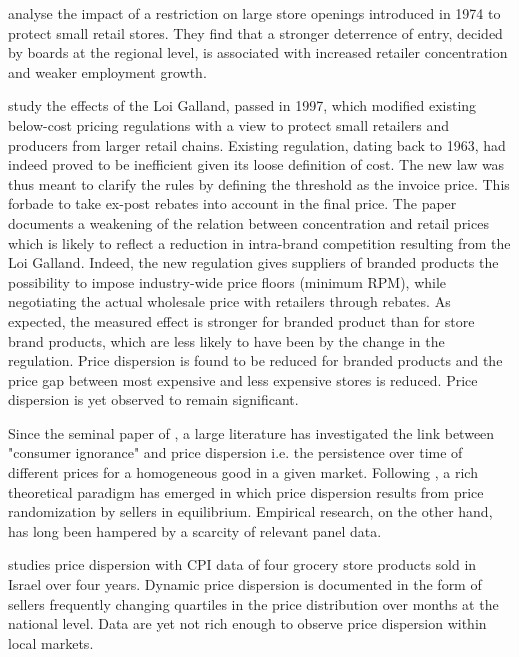 \documentclass[english]{article}
\begin{document}
\cite{BER02} analyse the impact of a restriction on large store openings introduced in 1974 to protect small retail stores. They find that a stronger deterrence of entry, decided by boards at the regional level, is associated with increased retailer concentration and weaker employment growth.

\cite{BIS13} study the effects of the Loi Galland, passed in 1997, which modified existing below-cost pricing regulations with a view to protect small retailers and producers from larger retail chains. Existing regulation, dating back to 1963, had indeed proved to be inefficient given its loose definition of cost. The new law was thus meant to clarify the rules by defining the threshold as the invoice price. This forbade to take ex-post rebates into account in the final price. The paper documents a weakening of the relation between concentration and retail prices which is likely to reflect a reduction in intra-brand competition resulting from the Loi Galland. Indeed, the new regulation gives suppliers of branded products the possibility to impose industry-wide price floors (minimum RPM), while negotiating the actual wholesale price with retailers through rebates. As expected, the measured effect is stronger for branded product than for store brand products, which are less likely to have been by the change in the regulation. Price dispersion is found to be reduced for branded products and the price gap between most expensive and less expensive stores is reduced. Price dispersion is yet observed to remain significant.

Since the seminal paper of \cite{STI61}, a large literature has investigated the link between "consumer ignorance" and price dispersion i.e. the persistence over time of different prices for a homogeneous good in a given market. Following \cite{VAR80}, a rich theoretical paradigm has emerged in which price dispersion results from price randomization by sellers in equilibrium. Empirical research, on the other hand, has long been hampered by a scarcity of relevant panel data.

\cite{LAC02} studies price dispersion with CPI data of four grocery store products sold in Israel over four years. Dynamic price dispersion is documented in the form of sellers frequently changing quartiles in the price distribution over months at the national level. Data are yet not rich enough to observe price dispersion within local markets.
\end{document}
